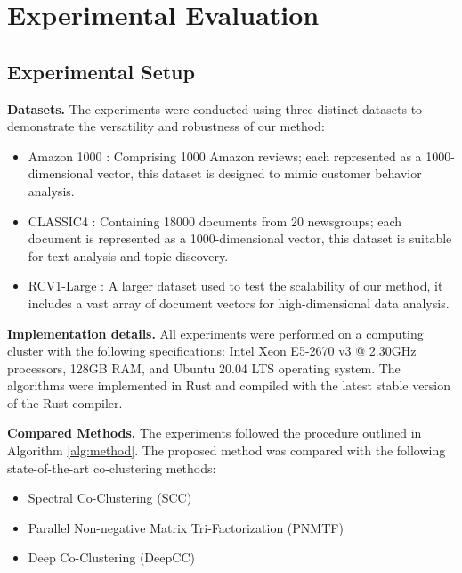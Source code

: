 
\section{Experimental Evaluation}
\label{sec:experiment}
\subsection{Experimental Setup}

\textbf{Datasets.}
The experiments were conducted using three distinct datasets to demonstrate the versatility and robustness of our method:

\begin{itemize}
    \item Amazon 1000 \cite{ni2019justifying}: Comprising 1000 Amazon reviews; each represented as a 1000-dimensional vector, this dataset is designed to mimic customer behavior analysis.
    \item CLASSIC4 \cite{reddy2021weclustering}: Containing 18000 documents from 20 newsgroups; each document is represented as a 1000-dimensional vector, this dataset is suitable for text analysis and topic discovery.
    \item RCV1-Large \cite{lewis2004rcv1}: A larger dataset used to test the scalability of our method, it includes a vast array of document vectors for high-dimensional data analysis.
\end{itemize}

\textbf{Implementation details.}
All experiments were performed on a computing cluster with the following specifications: Intel Xeon E5-2670 v3 @ 2.30GHz processors, 128GB RAM, and Ubuntu 20.04 LTS operating system. The algorithms were implemented in Rust and compiled with the latest stable version of the Rust compiler.

\textbf{Compared Methods.}
The experiments followed the procedure outlined in Algorithm \ref{alg:method}. The proposed method was compared with the following state-of-the-art co-clustering methods:

\begin{itemize}
    \item Spectral Co-Clustering (SCC) \cite{dhillon2001CoclusteringDocumentsWords}
    \item Parallel Non-negative Matrix Tri-Factorization (PNMTF)\cite{chen2023ParallelNonNegativeMatrix}
    \item Deep Co-Clustering (DeepCC) \cite{dongkuanxu2019DeepCoClustering}
\end{itemize}

